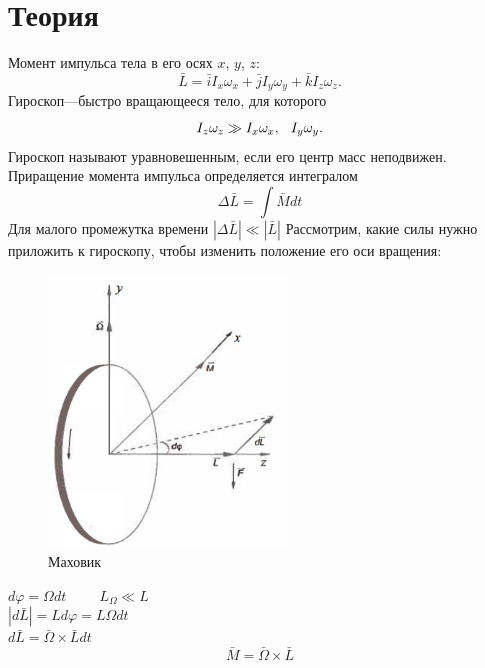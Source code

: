 \documentclass[a4paper, 12pt]{article}
\begin{document}
\section*{Теория}
Момент импульса тела в его осях $x$, $y$, $z$:
\begin{equation}
    \label{e1}
    \bar{L}=\bar{i}I_x\omega_x+\bar{j}I_y\omega_y+\bar{k}I_z\omega_z.
\end{equation}
Гироскоп---быстро вращающееся тело, для которого 
\begin{equation}
    \label{e2}
    I_z\omega_z\gg I_x\omega_x,\hspace{0.25cm} I_y\omega_y.
\end{equation}
Гироскоп называют уравновешенным, если его центр масс неподвижен.
Приращение момента импульса определяется интегралом
\begin{equation}
    \label{e3}
    \Delta \bar{L}=\int \bar{M} dt
\end{equation}
Для малого промежутка времени $|\Delta\bar{L}|\ll |\bar{L}|$
Рассмотрим, какие силы нужно приложить к гироскопу, чтобы изменить положение его оси вращения:
\begin{figure}
    \includegraphics[width=180pt]{image/png1.png}
    \caption{\label{p1}Маховик}
\end{figure}
$d\varphi=\Omega dt \hspace{1cm} L_\Omega \ll L$\\
$|d\bar{L}|=Ld\varphi=L\Omega dt$\\
$d\bar{L}=\bar{\Omega}\times\bar{L}dt$\\
\begin{equation}
    \label{e4}
    \bar{M}=\bar{\Omega}\times\bar{L}
\end{equation}
\end{document}
